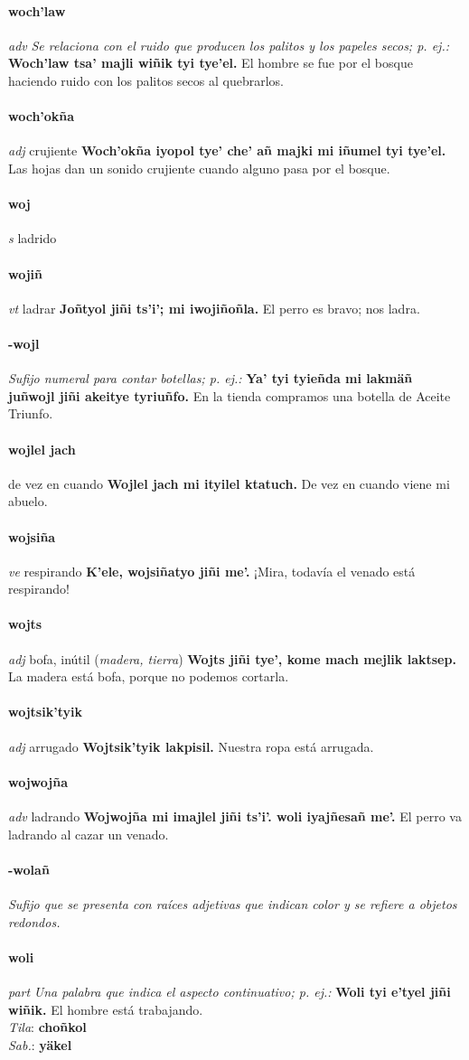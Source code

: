 \documentclass{scrbook}
\newcommand{\entry}[1]{\paragraph{#1}}
\newcommand{\nontranslationdef}[1]{\textit{#1}}
\newcommand{\partofspeech}[1]{\textit{#1}}
\newcommand{\spanishtranslation}[1]{#1}
\newcommand{\clarification}[1]{(\textit{#1})}
\newcommand{\cholexample}[1]{\textbf{#1}}
\newcommand{\exampletranslation}[1]{#1}
\newcommand{\dialectvariant}[1]{\\\textit{#1}:}
\newcommand{\dialectword}[1]{\textbf{#1}}
\begin{document}
\begin{multicols}{2}
\entry{woch'law}
\partofspeech{adv}
\nontranslationdef{Se relaciona con el ruido que producen los palitos y los papeles secos; p. ej.:}
\cholexample{Woch'law tsa' majli wiñik tyi tye'el.}
\exampletranslation{El hombre se fue por el bosque haciendo ruido con los palitos secos al quebrarlos.}

\entry{woch'okña}
\partofspeech{adj}
\spanishtranslation{crujiente}
\cholexample{Woch'okña iyopol tye' che' añ majki mi iñumel tyi tye'el.}
\exampletranslation{Las hojas dan un sonido crujiente cuando alguno pasa por el bosque.}

\entry{woj}
\partofspeech{s}
\spanishtranslation{ladrido}

\entry{wojiñ}
\partofspeech{vt}
\spanishtranslation{ladrar}
\cholexample{Joñtyol jiñi ts'i'; mi iwojiñoñla.}
\exampletranslation{El perro es bravo; nos ladra.}

\entry{-wojl}
\nontranslationdef{Sufijo numeral para contar botellas; p. ej.:}
\cholexample{Ya' tyi tyieñda mi lakmäñ juñwojl jiñi akeitye tyriuñfo.}
\exampletranslation{En la tienda compramos una botella de Aceite Triunfo.}

\entry{wojlel jach}
\spanishtranslation{de vez en cuando}
\cholexample{Wojlel jach mi ityilel ktatuch.}
\exampletranslation{De vez en cuando viene mi abuelo.}

\entry{wojsiña}
\partofspeech{ve}
\spanishtranslation{respirando}
\cholexample{K'ele, wojsiñatyo jiñi me'.}
\exampletranslation{¡Mira, todavía el venado está respirando!}

\entry{wojts}
\partofspeech{adj}
\spanishtranslation{bofa, inútil}
\clarification{madera, tierra}
\cholexample{Wojts jiñi tye', kome mach mejlik laktsep.}
\exampletranslation{La madera está bofa, porque no podemos cortarla.}

\entry{wojtsik'tyik}
\partofspeech{adj}
\spanishtranslation{arrugado}
\cholexample{Wojtsik'tyik lakpisil.}
\exampletranslation{Nuestra ropa está arrugada.}

\entry{wojwojña}
\partofspeech{adv}
\spanishtranslation{ladrando}
\cholexample{Wojwojña mi imajlel jiñi ts'i'. woli iyajñesañ me'.}
\exampletranslation{El perro va ladrando al cazar un venado.}

\entry{-wolañ}
\nontranslationdef{Sufijo que se presenta con raíces adjetivas que indican color y se refiere a objetos redondos.}

\entry{woli}
\partofspeech{part}
\nontranslationdef{Una palabra que indica el aspecto continuativo; p. ej.:}
\cholexample{Woli tyi e'tyel jiñi wiñik.}
\exampletranslation{El hombre está trabajando.}
\dialectvariant{Tila}
\dialectword{choñkol}
\dialectvariant{Sab.}
\dialectword{yäkel}


\end{multicols}
\end{document}
